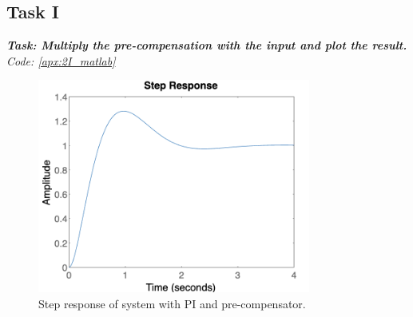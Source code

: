\subsection{Task I}
\textbf{\textit{Task: Multiply the pre-compensation with the input and plot the result.}}
\newline
\textit{Code: \ref{apx:2I_matlab}}

\begin{figure}[h!]
    \centering
    \includegraphics[width = 0.8\textwidth]{Images/2I_Step.png}
    \caption{Step response of system with PI and pre-compensator.}
    \label{fig:2I_Step}
\end{figure}